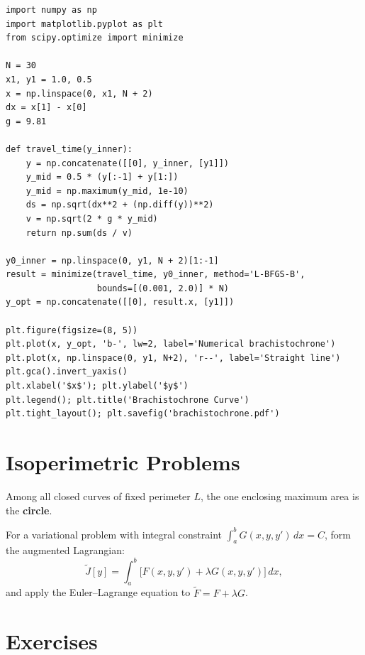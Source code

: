 \begin{codeblock}[title=\textbf{Numerical brachistochrone}]
\begin{verbatim}
import numpy as np
import matplotlib.pyplot as plt
from scipy.optimize import minimize

N = 30
x1, y1 = 1.0, 0.5
x = np.linspace(0, x1, N + 2)
dx = x[1] - x[0]
g = 9.81

def travel_time(y_inner):
    y = np.concatenate([[0], y_inner, [y1]])
    y_mid = 0.5 * (y[:-1] + y[1:])
    y_mid = np.maximum(y_mid, 1e-10)
    ds = np.sqrt(dx**2 + (np.diff(y))**2)
    v = np.sqrt(2 * g * y_mid)
    return np.sum(ds / v)

y0_inner = np.linspace(0, y1, N + 2)[1:-1]
result = minimize(travel_time, y0_inner, method='L-BFGS-B',
                  bounds=[(0.001, 2.0)] * N)
y_opt = np.concatenate([[0], result.x, [y1]])

plt.figure(figsize=(8, 5))
plt.plot(x, y_opt, 'b-', lw=2, label='Numerical brachistochrone')
plt.plot(x, np.linspace(0, y1, N+2), 'r--', label='Straight line')
plt.gca().invert_yaxis()
plt.xlabel('$x$'); plt.ylabel('$y$')
plt.legend(); plt.title('Brachistochrone Curve')
plt.tight_layout(); plt.savefig('brachistochrone.pdf')
\end{verbatim}
\end{codeblock}

\section{Isoperimetric Problems}

\begin{theorem}
Among all closed curves of fixed perimeter $L$, the one enclosing
maximum area is the \textbf{circle}.
\end{theorem}

\begin{definition}
For a variational problem with integral constraint
$\int_a^b G(x,y,y')\,dx = C$, form the augmented Lagrangian:
\[
  \tilde{J}[y] = \int_a^b \bigl[F(x,y,y') + \lambda G(x,y,y')\bigr]\,dx,
\]
and apply the Euler--Lagrange equation to $\tilde{F}=F+\lambda G$.
\end{definition}

\section{Exercises}

